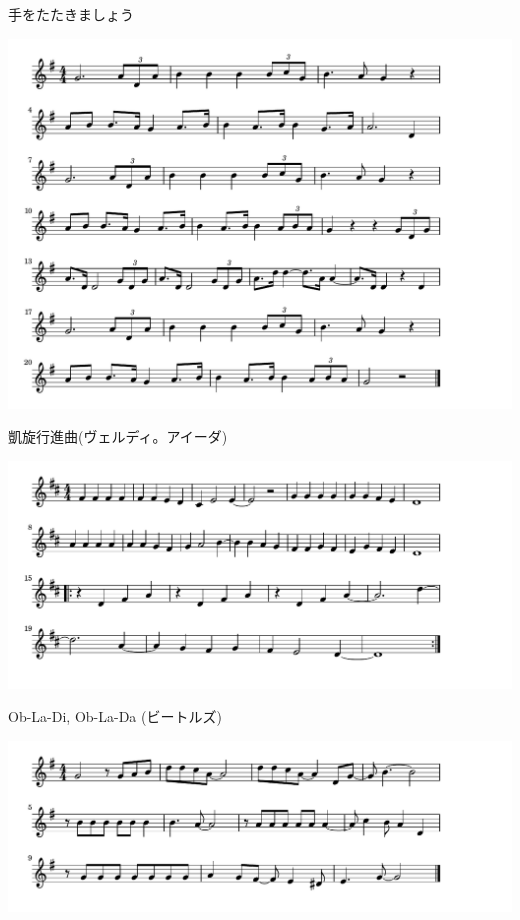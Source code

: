 \documentclass[a4paper]{ltjsarticle}
\begin{document}
\vspace{-10mm} \hspace{10mm}
手をたたきましょう

\includegraphics[clip]{gaisen_crop.pdf}

\vspace{-10mm} \hspace{10mm}
凱旋行進曲(ヴェルディ。アイーダ)

\includegraphics[clip]{obladi_crop.pdf}

\vspace{-10mm} \hspace{10mm}
Ob-La-Di, Ob-La-Da (ビートルズ)

\includegraphics[clip]{carrythatweight_crop.pdf}
\end{document}
